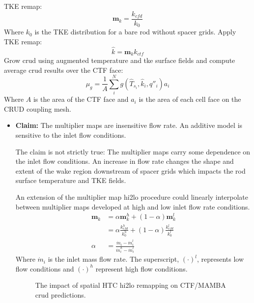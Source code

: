 \begin{itemize}
    TKE remap:
    \begin{equation}
       \mathbf m_{k} = \frac{k_{cfd}}{k_{0}}
    \end{equation}
    Where $k_0$ is the TKE distribution for a bare rod without spacer grids.
    Apply TKE remap:
       \begin{equation}
       \hat k = \mathbf m_k k_{ctf}
       \end{equation}
     Grow crud using augmented temperature and tke surface fields and compute average crud results over the CTF face:
     \begin{equation}
     \mu_g = \frac{1}{A} \sum_i^N g(\hat T_{s_i}, \hat k_i, q''_i) a_i
     \end{equation}
    Where $A$ is the area of the CTF face and $a_i$ is the area of each cell face on the CRUD coupling mesh.

    \begin{itemize}
    \item \textbf{Claim:} The multiplier maps are insensitive flow rate.  An additive model is sensitive to the inlet flow conditions.

     The claim is not strictly true: The multiplier maps carry some dependence on the inlet flow conditions.  An increase in flow rate changes the shape and extent of the wake region downstream of spacer grids which impacts the rod surface temperature and TKE fields.

    An extension of the multiplier map hi2lo procedure could linearly interpolate between multiplier maps developed at high and low inlet flow rate conditions.
    \begin{align*}
        \mathbf m_k &= \alpha \mathbf m_k^h + (1 - \alpha) \mathbf m_k^l \\
                    &= \alpha \frac{k^h_{cfd}}{k^h_0} + (1 - \alpha) \frac{k^l_{cfd}}{k^l_0} \\
        \alpha & = \frac{\dot m_i - \dot m_i^l }{\dot m_i^h - \dot m_i^l}
    \end{align*}
    Where $\dot m_i$ is the inlet mass flow rate.  The superscript, $(\cdot)^l$, represents low flow conditions and $(\cdot)^h$ represent high flow conditions.


\begin{figure}[H]%
    \centering
    \qquad
    \caption[The impact of spatial HTC hi2lo remapping on CTF/MAMBA crud predictions.]{The impact of spatial HTC hi2lo remapping on CTF/MAMBA crud predictions.}%
    \label{fig:htc_remap_crud}%
\end{figure}



\end{itemize}
\end{itemize}
